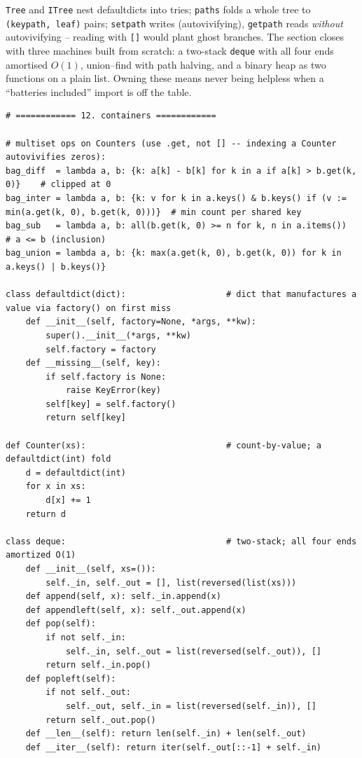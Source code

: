 \documentclass[11pt,letterpaper]{book}
\begin{document}
\texttt{Tree} and \texttt{ITree} nest defaultdicts into tries;
\texttt{paths} folds a whole tree to \texttt{(keypath, leaf)} pairs;
\texttt{setpath} writes (autovivifying), \texttt{getpath} reads
\emph{without} autovivifying -- reading with \texttt{[]} would plant ghost
branches. The section closes with three machines built from scratch: a
two-stack \texttt{deque} with all four ends amortised $O(1)$, union--find with
path halving, and a binary heap as two functions on a plain list. Owning these
means never being helpless when a ``batteries included'' import is off the
table.
\begin{lstlisting}[style=code]
# ============ 12. containers ============

# multiset ops on Counters (use .get, not [] -- indexing a Counter autovivifies zeros):
bag_diff  = lambda a, b: {k: a[k] - b[k] for k in a if a[k] > b.get(k, 0)}    # clipped at 0
bag_inter = lambda a, b: {k: v for k in a.keys() & b.keys() if (v := min(a.get(k, 0), b.get(k, 0)))}  # min count per shared key
bag_sub   = lambda a, b: all(b.get(k, 0) >= n for k, n in a.items())          # a <= b (inclusion)
bag_union = lambda a, b: {k: max(a.get(k, 0), b.get(k, 0)) for k in a.keys() | b.keys()}

class defaultdict(dict):                    # dict that manufactures a value via factory() on first miss
    def __init__(self, factory=None, *args, **kw):
        super().__init__(*args, **kw)
        self.factory = factory
    def __missing__(self, key):
        if self.factory is None:
            raise KeyError(key)
        self[key] = self.factory()
        return self[key]

def Counter(xs):                            # count-by-value; a defaultdict(int) fold
    d = defaultdict(int)
    for x in xs:
        d[x] += 1
    return d

class deque:                                # two-stack; all four ends amortized O(1)
    def __init__(self, xs=()):
        self._in, self._out = [], list(reversed(list(xs)))
    def append(self, x): self._in.append(x)
    def appendleft(self, x): self._out.append(x)
    def pop(self):
        if not self._in:
            self._in, self._out = list(reversed(self._out)), []
        return self._in.pop()
    def popleft(self):
        if not self._out:
            self._out, self._in = list(reversed(self._in)), []
        return self._out.pop()
    def __len__(self): return len(self._in) + len(self._out)
    def __iter__(self): return iter(self._out[::-1] + self._in)


\end{lstlisting}
\end{document}
